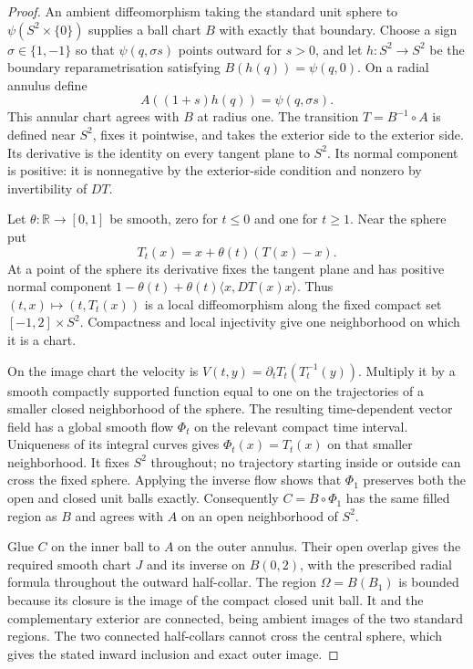 \begin{proof}
An ambient diffeomorphism taking the standard
unit sphere to $\psi(S^2\times\{0\})$ supplies a ball chart $B$ with exactly
that boundary.  Choose a sign $\sigma\in\{1,-1\}$ so that
$\psi(q,\sigma s)$ points outward for $s>0$, and let $h:S^2\to S^2$
be the boundary reparametrisation satisfying
$B(h(q))=\psi(q,0)$.  On a radial annulus define
\[
 A((1+s)h(q))=\psi(q,\sigma s).
\]
This annular chart agrees with $B$ at radius one.  The transition
$T=B^{-1}\circ A$ is defined near $S^2$, fixes it pointwise, and takes
the exterior side to the exterior side.  Its derivative is the identity
on every tangent plane to $S^2$.  Its normal component is positive:
it is nonnegative by the exterior-side condition and nonzero by
invertibility of $DT$.

Let $\theta:\mathbb R\to[0,1]$ be smooth, zero for $t\le0$ and one
for $t\ge1$.  Near the sphere put
\[
 T_t(x)=x+\theta(t)(T(x)-x).
\]
At a point of the sphere its derivative fixes the tangent plane and
has positive normal component
$1-\theta(t)+\theta(t)\langle x,DT(x)x\rangle$.
Thus $(t,x)\mapsto(t,T_t(x))$ is a local diffeomorphism along the
fixed compact set $[-1,2]\times S^2$.  Compactness and local
injectivity give one neighborhood on which it is a chart.

On the image chart the velocity is
$V(t,y)=\partial_tT_t(T_t^{-1}(y))$.
Multiply it by a smooth compactly supported function equal to one on
the trajectories of a smaller closed neighborhood of the sphere.
The resulting time-dependent vector field has a global smooth flow
$\Phi_t$ on the relevant compact time interval.  Uniqueness of its
integral curves gives $\Phi_t(x)=T_t(x)$ on that smaller neighborhood.
It fixes $S^2$ throughout; no trajectory starting inside or outside
can cross the fixed sphere.  Applying the inverse flow shows that
$\Phi_1$ preserves both the open and closed unit balls exactly.
Consequently $C=B\circ\Phi_1$ has the same filled region as $B$ and
agrees with $A$ on an open neighborhood of $S^2$.

Glue $C$ on the inner ball to $A$ on the outer annulus.  Their open
overlap gives the required smooth chart $J$ and its inverse on $B(0,2)$,
with the prescribed radial formula throughout the outward half-collar.
The region $\Omega=B(B_1)$ is bounded because its closure is the image
of the compact closed unit ball.  It and the complementary exterior
are connected, being ambient images of the two standard regions.
The two connected half-collars cannot cross the central sphere, which
gives the stated inward inclusion and exact outer image.
\end{proof}

